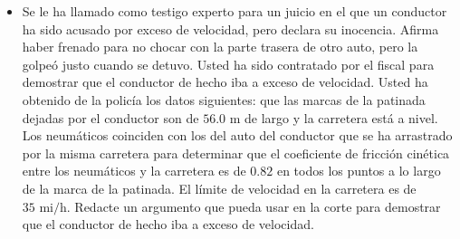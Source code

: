 \documentclass[11pt,a4paper]{article}
\begin{document}
\begin{itemize}
    \item[\textbf{33.}] Se le ha llamado como testigo experto para un juicio en el que un conductor ha sido acusado por exceso de velocidad, pero declara su inocencia. Afirma haber frenado para no chocar con la parte trasera de otro auto, pero la golpeó justo cuando se detuvo. Usted ha sido contratado por el fiscal para demostrar que el conductor de hecho iba a exceso de velocidad. Usted ha obtenido de la policía los datos siguientes: que las marcas de la patinada dejadas por el conductor son de $56.0 \text{ m}$ de largo y la carretera está a nivel. Los neumáticos coinciden con los del auto del conductor que se ha arrastrado por la misma carretera para determinar que el coeficiente de fricción cinética entre los neumáticos y la carretera es de $0.82$ en todos los puntos a lo largo de la marca de la patinada. El límite de velocidad en la carretera es de $35 \text{ mi/h}$. Redacte un argumento que pueda usar en la corte para demostrar que el conductor de hecho iba a exceso de velocidad.
    \vspace*{7cm}
\end{itemize}

\newpage
\end{document}
